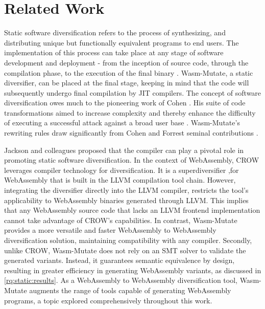 \documentclass[a4paper,fleqn]{cas-dc}
\newcommand*\badge[1]{ \colorbox{red}{\color{white}#1}}
\newcommand{\tool}{{\sc Wasm-Mutate}\xspace}
\newcommand{\Wasm}{WebAssembly\xspace}
\newcommand{\wasm}{\Wasm}
\newcommand{\todo}[1]{%
\refstepcounter{todo}
\noindent\textbf{\badge{TODO}} {\color{red}#1}
\addcontentsline{td}{todo}
{\color{red}\thesection.\thetodo\xspace #1}}
\begin{document}
\section{Related Work}
\label{rw}


Static software diversification refers to the process of  synthesizing, and distributing unique but functionally equivalent programs to end users. 
The implementation of this process can take place at any stage of software development and deployment - from the inception of source code, through the compilation phase, to the execution of the final binary \cite{jackson2011compiler, lundquist2016searching}.
\tool, a static diversifier, can be placed at the final stage, keeping in mind that the code will subsequently undergo final compilation by JIT compilers.
The concept of software diversification owes much to the pioneering work of Cohen \cite{cohen1993operating}. 
His suite of code transformations aimed to increase complexity and thereby enhance the difficulty of executing a successful attack against a broad user base \cite{cohen1993operating}. 
\tool's rewriting rules draw significantly from Cohen and Forrest seminal contributions \cite{cohen1993operating, 595185}.

Jackson and colleagues \cite{jackson2011compiler} proposed that the compiler can play a pivotal role in promoting static software diversification. 
In the context of \wasm, CROW leverages compiler technology for diversification.
It is a superdiversifier \cite{jacob2008superdiversifier},for \wasm that is built in the LLVM compilation tool chain. However, integrating the diversifier directly into the LLVM compiler, restricts the tool's applicability to \wasm binaries generated through LLVM. 
This implies that any \wasm source code that lacks an LLVM frontend implementation cannot take advantage of CROW's capabilities.
In contrast, \tool  provides a more versatile and faster \wasm to \wasm diversification solution, maintaining compatibility with any compiler. 
Secondly, unlike CROW, \tool does not rely on an SMT solver to validate the generated variants. 
Instead, it guarantees semantic equivalence by design, resulting in greater efficiency in generating \wasm variants, as discussed in \autoref{rq:static:results}.
As a \wasm to \wasm diversification tool, \tool augments the range of tools capable of generating \wasm programs, a topic explored comprehensively throughout this work.
\end{document}
